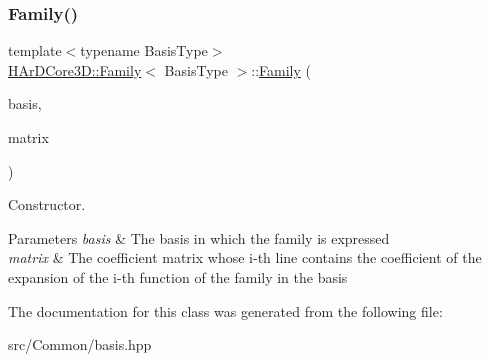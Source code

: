 \subsubsection{\texorpdfstring{Family()}{Family()}}
{\footnotesize\ttfamily template$<$typename Basis\+Type$>$ \\
\hyperlink{classHArDCore3D_1_1Family}{H\+Ar\+D\+Core3\+D\+::\+Family}$<$ Basis\+Type $>$\+::\hyperlink{classHArDCore3D_1_1Family}{Family} (\begin{DoxyParamCaption}\item[{const Basis\+Type \&}]{basis,  }\item[{const Eigen\+::\+Matrix\+Xd \&}]{matrix }\end{DoxyParamCaption})\hspace{0.3cm}{\ttfamily [inline]}}



Constructor. 


\begin{DoxyParams}{Parameters}
{\em basis} & The basis in which the family is expressed \\
\hline
{\em matrix} & The coefficient matrix whose i-\/th line contains the coefficient of the expansion of the i-\/th function of the family in the basis \\
\hline
\end{DoxyParams}


The documentation for this class was generated from the following file\+:\begin{DoxyCompactItemize}
\item 
src/\+Common/basis.\+hpp\end{DoxyCompactItemize}
